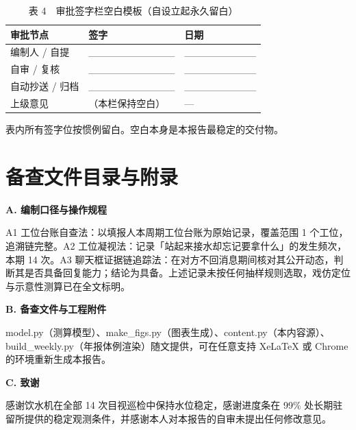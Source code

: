 \documentclass[11pt,a4paper]{article}
\begin{document}
\begin{table}[ht]
\centering
\small
\caption*{表 4　审批签字栏空白模板（自设立起永久留白）}
\begin{tabular}{ m{} m{} m{} }
\hline\hline
\textbf{审批节点} & \textbf{签字} & \textbf{日期} \\
\hline

编制人 / 自提 & \_\_\_\_\_\_\_\_\_\_\_\_ & \_\_\_\_\_\_\_\_\_\_ \\

自审 / 复核 & \_\_\_\_\_\_\_\_\_\_\_\_ & \_\_\_\_\_\_\_\_\_\_ \\

自动抄送 / 归档 & \_\_\_\_\_\_\_\_\_\_\_\_ & \_\_\_\_\_\_\_\_\_\_ \\

上级意见 & （本栏保持空白） & — \\

\hline\hline
\end{tabular}
\par\vspace{1mm}\footnotesize 表内所有签字位按惯例留白。空白本身是本报告最稳定的交付物。
\end{table}
\normalsize

\section*{备查文件目录与附录}
\noindent\textbf{A. 编制口径与操作规程}\par
A1 工位台账自查法：以填报人本周期工位台账为原始记录，覆盖范围 1 个工位，追溯链完整。A2 工位凝视法：记录「站起来接水却忘记要拿什么」的发生频次，本期 14 次。A3 聊天框证据链追踪法：在对方不回消息期间核对其公开动态，判断其是否具备回复能力；结论为具备。上述记录未按任何抽样规则选取，戏仿定位与示意性测算已在全文标明。\par\vspace{2mm}

\noindent\textbf{B. 备查文件与工程附件}\par
model.py（测算模型）、make\_figs.py（图表生成）、content.py（本内容源）、build\_weekly.py（年报体例渲染）随文提供，可在任意支持 XeLaTeX 或 Chrome 的环境重新生成本报告。\par\vspace{2mm}

\noindent\textbf{C. 致谢}\par
感谢饮水机在全部 14 次目视巡检中保持水位稳定，感谢进度条在 99\% 处长期驻留所提供的稳定观测条件，并感谢本人对本报告的自审未提出任何修改意见。\par\vspace{2mm}
\end{document}
